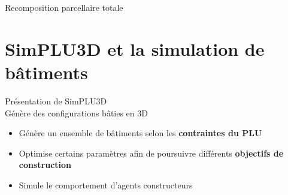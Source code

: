 \documentclass[xcolor=table]{beamer}
\begin{document}

\begin{frame}{Recomposition parcellaire totale}
\end{frame}


\section[SimPLU3D]{SimPLU3D et la simulation de bâtiments}



\begin{frame}{Présentation de SimPLU3D}
	\\
	Génère des configurations bâties en 3D
	\begin{itemize}
		\item Génère un ensemble de bâtiments selon les \textbf{contraintes du PLU}
		\item Optimise certains paramètres afin de poursuivre différents \textbf{objectifs de construction}
		\item Simule le comportement d'agents constructeurs
	\end{itemize} 
\end{frame}
\end{document}
